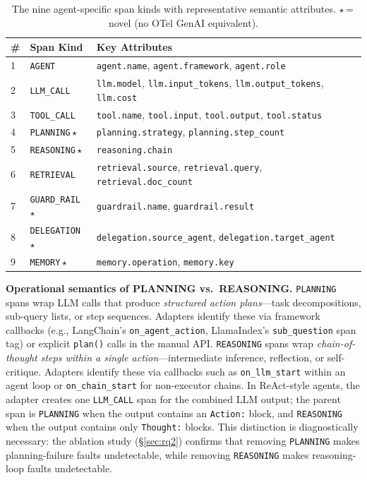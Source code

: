 \documentclass[sigplan,10pt,screen]{acmart}
\begin{document}
\begin{table}[t]
\centering
\small
\caption{The nine agent-specific span kinds with representative
semantic attributes.  $\star$\,=\,novel (no OTel GenAI equivalent).}
\label{tab:spantaxonomy}
\begin{tabular}{@{}llp{3.8cm}@{}}
\toprule
\textbf{\#} & \textbf{Span Kind} & \textbf{Key Attributes} \\
\midrule
1 & \texttt{AGENT}      & \texttt{agent.name}, \texttt{agent.framework}, \texttt{agent.role} \\
2 & \texttt{LLM\_CALL}  & \texttt{llm.model}, \texttt{llm.input\_tokens}, \texttt{llm.output\_tokens}, \texttt{llm.cost} \\
3 & \texttt{TOOL\_CALL} & \texttt{tool.name}, \texttt{tool.input}, \texttt{tool.output}, \texttt{tool.status} \\
4 & \texttt{PLANNING}\,$\star$   & \texttt{planning.strategy}, \texttt{planning.step\_count} \\
5 & \texttt{REASONING}\,$\star$  & \texttt{reasoning.chain} \\
6 & \texttt{RETRIEVAL}  & \texttt{retrieval.source}, \texttt{retrieval.query}, \texttt{retrieval.doc\_count} \\
7 & \texttt{GUARD\_RAIL}\,$\star$& \texttt{guardrail.name}, \texttt{guardrail.result} \\
8 & \texttt{DELEGATION}\,$\star$ & \texttt{delegation.source\_agent}, \texttt{delegation.target\_agent} \\
9 & \texttt{MEMORY}\,$\star$     & \texttt{memory.operation}, \texttt{memory.key} \\
\bottomrule
\end{tabular}
\end{table}

\textbf{Operational semantics of PLANNING vs.\ REASONING.}
\texttt{PLANNING} spans wrap LLM calls that produce \emph{structured
action plans}---task decompositions, sub-query lists, or step
sequences.  Adapters identify these via framework callbacks
(e.g., LangChain's \texttt{on\_agent\_action}, LlamaIndex's
\texttt{sub\_question} span tag) or explicit \texttt{plan()} calls
in the manual API.  \texttt{REASONING} spans wrap
\emph{chain-of-thought steps within a single action}---intermediate
inference, reflection, or self-critique.  Adapters identify these via
callbacks such as \texttt{on\_llm\_start} within an agent loop or
\texttt{on\_chain\_start} for non-executor chains.
In ReAct-style agents, the adapter creates one \texttt{LLM\_CALL}
span for the combined LLM output; the parent span is
\texttt{PLANNING} when the output contains an \texttt{Action:} block,
and \texttt{REASONING} when the output contains only
\texttt{Thought:} blocks.  This distinction is diagnostically
necessary: the ablation study (\S\ref{sec:rq2}) confirms that
removing \texttt{PLANNING} makes planning-failure faults undetectable,
while removing \texttt{REASONING} makes reasoning-loop faults
undetectable.
\end{document}
